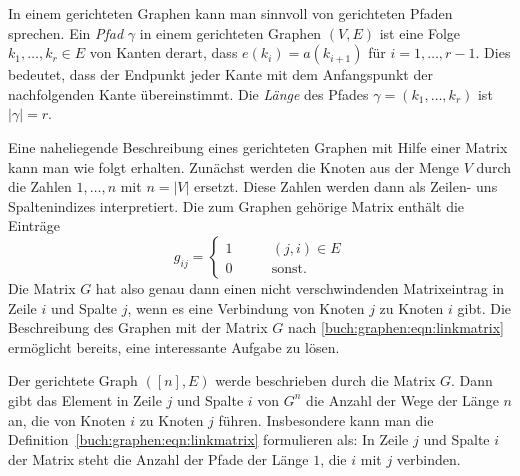In einem gerichteten Graphen kann man sinnvoll von gerichteten Pfaden
sprechen.
%
Ein {\em Pfad} $\gamma$ in einem gerichteten Graphen $(V,E)$ ist eine Folge
$k_1,\dots,k_r\in E$ von Kanten derart, dass $e(k_i) = a(k_{i+1})$
für $i=1,\dots,r-1$.
Dies bedeutet, dass der Endpunkt jeder Kante mit dem Anfangspunkt der
nachfolgenden Kante übereinstimmt.
Die {\em Länge} des Pfades $\gamma=(k_1,\dots,k_r)$ ist $|\gamma|=r$.

Eine naheliegende Beschreibung eines gerichteten Graphen mit Hilfe einer
Matrix kann man wie folgt erhalten.
Zunächst werden die Knoten aus der Menge $V$ durch die Zahlen
$1,\dots,n$ mit $n=|V|$ ersetzt.
Diese Zahlen werden dann als Zeilen- uns Spaltenindizes interpretiert.
Die zum Graphen gehörige Matrix enthält die Einträge
\begin{equation}
g_{ij}
=
\begin{cases}
1&\qquad  (j,i) \in E\\
0&\qquad  \text{sonst.}
\end{cases}
\label{buch:graphen:eqn:linkmatrix}
\end{equation}
Die Matrix $G$ hat also genau dann einen nicht verschwindenden
Matrixeintrag in Zeile $i$ und Spalte $j$, wenn es eine Verbindung
von Knoten $j$ zu Knoten $i$ gibt.
Die Beschreibung des Graphen mit der Matrix $G$ nach
\eqref{buch:graphen:eqn:linkmatrix} ermöglicht bereits, eine interessante
Aufgabe zu lösen.

\begin{satz}
\label{buch:graphen:pfade-der-laenge-n}
Der gerichtete Graph $([n],E)$ werde beschrieben durch die Matrix $G$.
Dann gibt das Element in Zeile $j$ und Spalte $i$ von $G^n$ die Anzahl
der Wege der Länge $n$ an, die von Knoten $i$ zu Knoten $j$ führen.
Insbesondere kann man die Definition~\eqref{buch:graphen:eqn:linkmatrix}
formulieren als: In Zeile $j$ und Spalte $i$ der Matrix steht die Anzahl
der Pfade der Länge $1$, die $i$ mit $j$ verbinden.
\end{satz}

